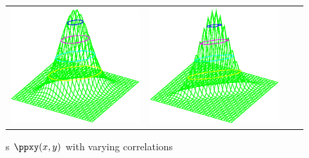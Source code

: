 \begin{figure}
\begin{tabular}{*{4}{c}}
  \includegraphics[width=\tw/4-5mm,clip=true]{../common/normxy_80.eps} &
  \includegraphics[width=\tw/4-5mm,clip=true]{../common/normxy_95.eps}
\end{tabular}
\caption{
  s $\ppxy(x,y)$ with varying correlations
  \label{fig:psub_joint_gaussian}
  }
\end{figure}


